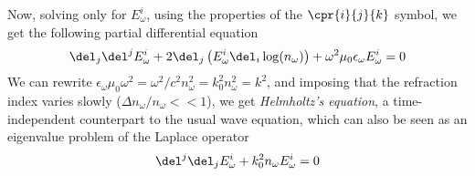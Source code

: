\documentclass[../electromagnetism.tex]{subfiles}
\begin{document}
Now, solving only for $E_\omega^i$, using the properties of the $\cpr{i}{j}{k}$ symbol, we get the following partial differential equation
\begin{equation}
	\del_j\del^jE^i_\omega+2\del_j\left( E^i_\omega\del_i\log(n_\omega) \right)+\omega^2\mu_0\epsilon_\omega E^i_\omega=0
	\label{eq:firsthemholtz}
\end{equation}
We can rewrite $\epsilon_\omega\mu_0\omega^2=\omega^2/c^2n_\omega^2=k_0^2n_\omega^2=k^2$, and imposing that the refraction index varies slowly ($\Delta n_\omega/n_\omega<<1$), we get \textit{Helmholtz's equation}, a time-independent counterpart to the usual wave equation, which can also be seen as an eigenvalue problem of the Laplace operator
\begin{equation}
	\del^j\del_jE^i_\omega+k_0^2n_\omega E^i_\omega=0
	\label{eq:helmholtzeq}
\end{equation}
\end{document}
